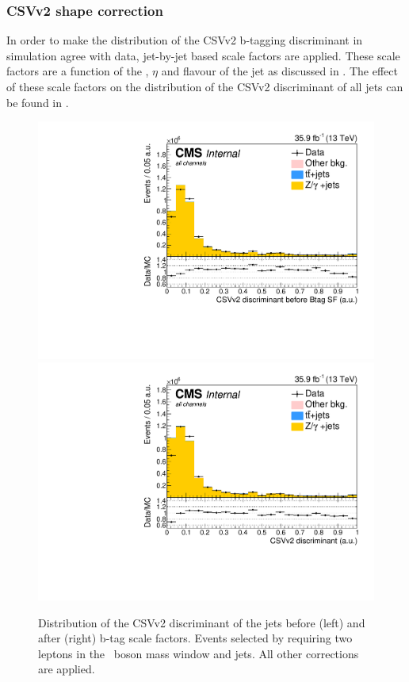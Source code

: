 \subsubsection*{CSVv2 shape correction}
In order to make the distribution of the CSVv2 b-tagging discriminant in simulation agree with data,  jet-by-jet based scale factors are applied. These scale factors are a function of the \pt, $\eta$ and flavour of the jet as discussed in .  The effect of these scale factors on the distribution of the CSVv2 discriminant of all jets can be found in .


\begin{figure}[htbp]
	\centering
	\includegraphics[width=0.49\linewidth]{5_Eventselection/Figures/ReweighingNew/2lepcontrol_dilep_bdisc_bfBT_all_Stack}
	\includegraphics[width=0.49\linewidth]{5_Eventselection/Figures/ReweighingNew/2lepcontrol_dilep_bdisc_all_Stack}	
	\caption{Distribution of the CSVv2 discriminant of the jets before (left) and after (right) b-tag scale factors.  Events selected by requiring two leptons in the \PZ\ boson mass window and jets. All other corrections are applied.}
	\label{fig:bSF}
\end{figure}

